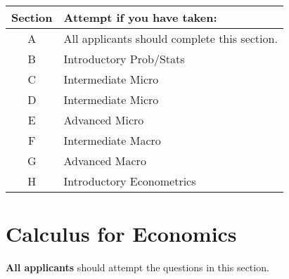 \documentclass[addpoints,12pt]{exam}
\begin{document}
\vspace{2em}

\begin{center}
  \begin{tabular}[h]{cl}
  \textbf{Section} & \textbf{Attempt if you have taken:}\\
    \hline
    A & All applicants should complete this section.\\
    B & Introductory Prob/Stats \\
    C & Intermediate Micro \\
    D & Intermediate Micro \\
    E & Advanced Micro\\
    F & Intermediate Macro\\
    G & Advanced Macro\\
    H & Introductory Econometrics \\
  \end{tabular}
\end{center}




\newpage


\section{Calculus for Economics}
\textbf{All applicants} should attempt the questions in this section. 
\end{document}
